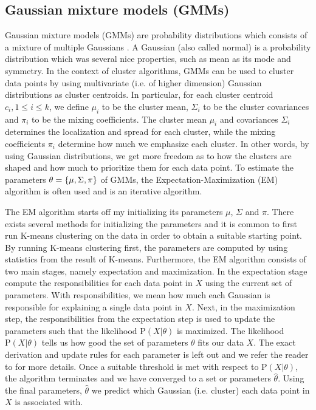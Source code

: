 \subsection{Gaussian mixture models (GMMs)}
\label{sec:gmm-clustering}
Gaussian mixture models (GMMs) are probability distributions which consists of a mixture of multiple Gaussians \cite[Section 9.2]{bishop2006}. A Gaussian (also called normal) is a probability distribution which was several nice properties, such as mean as its mode and symmetry. In the context of cluster algorithms, GMMs can be used to cluster data points by using multivariate (i.e. of higher dimension) Gaussian distributions as cluster centroids. In particular, for each cluster centroid $c_i, 1 \leq i \leq k$, we define $\mu_i$ to be the cluster mean, $\Sigma_i$ to be the cluster covariances and $\pi_i$ to be the mixing coefficients. The cluster mean $\mu_i$ and covariances $\Sigma_i$ determines the localization and spread for each cluster, while the mixing coefficients $\pi_i$ determine how much we emphasize each cluster. In other words, by using Gaussian distributions, we get more freedom as to how the clusters are shaped and how much to prioritize them for each data point. To estimate the parameters $\theta = \left\{\mu, \Sigma, \pi\right\}$ of GMMs, the Expectation-Maximization (EM) algorithm is often used and is an iterative algorithm.

The EM algorithm starts off my initializing its parameters $\mu$, $\Sigma$ and $\pi$. There exists several methods for initializing the parameters and it is common to first run K-means clustering on the data in order to obtain a suitable starting point. By running K-means clustering first, the parameters are computed by using statistics from the result of K-means. Furthermore, the EM algorithm consists of two main stages, namely expectation and maximization. In the expectation stage compute the responsibilities for each data point in $X$ using the current set of parameters. With responsibilities, we mean how much each Gaussian is responsible for explaining a single data point in $X$. Next, in the maximization step, the responsibilities from the expectation step is used to update the parameters such that the likelihood $\text{P}(X | \theta)$ is maximized. The likelihood $\text{P}(X | \theta)$ tells us how good the set of parameters $\theta$ fits our data $X$. The exact derivation and update rules for each parameter is left out and we refer the reader to \cites[Section 9.4]{bishop2006} for more details. Once a suitable threshold is met with respect to $\text{P}(X | \theta)$, the algorithm terminates and we have converged to a set or parameters $\hat{\theta}$. Using the final parameters, $\hat{\theta}$ we predict which Gaussian (i.e. cluster) each data point in $X$ is associated with.


